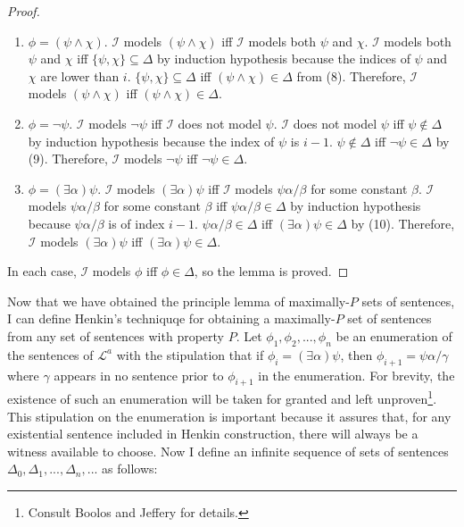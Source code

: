 \documentclass[12pt]{article}
\theoremstyle{definition}
\theoremstyle{remark}
\begin{document}
\begin{proof}
	\begin{enumerate}
		\item $\phi = (\psi \land \chi)$. $\mathscr{I}$ models $(\psi \land \chi)$ iff $\mathscr{I}$ models both $\psi$ and $\chi$. $\mathscr{I}$ models both $\psi$ and $\chi$ iff $\{ \psi, \chi \} \subseteq \Delta$ by induction hypothesis because the indices of $\psi$ and $\chi$ are lower than $i$. $\{ \psi, \chi \} \subseteq \Delta$ iff $(\psi \land \chi) \in \Delta$ from (8). Therefore, $\mathscr{I}$ models $(\psi \land \chi)$ iff $(\psi \land \chi) \in \Delta$.
		\item $\phi = \neg\psi$. $\mathscr{I}$ models $\neg\psi$ iff $\mathscr{I}$ does not model $\psi$. $\mathscr{I}$ does not model $\psi$ iff $\psi \not\in \Delta$ by induction hypothesis because the index of $\psi$ is $i-1$. $\psi \not\in \Delta$ iff $\neg\psi \in \Delta$ by (9). Therefore, $\mathscr{I}$ models $\neg\psi$ iff $\neg\psi \in \Delta$.
		\item $\phi = (\exists \alpha)\psi$. $\mathscr{I}$ models $(\exists \alpha)\psi$ iff $\mathscr{I}$ models $\psi\alpha/\beta$ for some constant $\beta$. $\mathscr{I}$ models $\psi\alpha/\beta$ for some constant $\beta$ iff $\psi\alpha/\beta \in \Delta$ by induction hypothesis because $\psi\alpha/\beta$ is of index $i-1$. $\psi\alpha/\beta \in \Delta$ iff $(\exists \alpha)\psi \in \Delta$ by (10). Therefore, $\mathscr{I}$ models $(\exists \alpha)\psi$ iff $(\exists \alpha)\psi \in \Delta$.
	\end{enumerate}

	In each case, $\mathscr{I}$ models $\phi$ iff $\phi \in \Delta$, so the lemma is proved.
\end{proof}

Now that we have obtained the principle lemma of maximally-$P$ sets of sentences, I can define Henkin's techniquqe for obtaining a maximally-$P$ set of sentences from any set of sentences with property $P$. Let $\phi_1, \phi_2, ..., \phi_n$ be an enumeration of the sentences of $\mathscr{L}^a$ with the stipulation that if $\phi_i = (\exists \alpha)\psi$, then $\phi_{i+1} = \psi\alpha/\gamma$ where $\gamma$ appears in no sentence prior to $\phi_{i+1}$ in the enumeration. For brevity, the existence of such an enumeration will be taken for granted and left unproven\footnote{Consult Boolos and Jeffery\cite{boolos_jeffery} for details.}. This stipulation on the enumeration is important because it assures that, for any existential sentence included in Henkin construction, there will always be a witness available to choose. Now I define an infinite sequence of sets of sentences $\Delta_0, \Delta_1, ..., \Delta_n, ...$ as follows:
\end{document}
